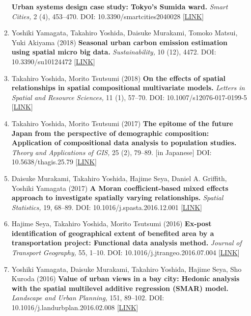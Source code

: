 \documentclass[
]{book}
\begin{document}
\begin{enumerate}
  \textbf{Urban systems design case study: Tokyo's Sumida ward.}
  \emph{Smart Cities,} 2 (4), 453--470.
  DOI: 10.3390/smartcities2040028 {[}\href{https://www.mdpi.com/2624-6511/2/4/28}{LINK}{]}
\item
  Yoshiki Yamagata, Takahiro Yoshida, Daisuke Murakami, Tomoko Matsui, Yuki Akiyama (2018)
  \textbf{Seasonal urban carbon emission estimation using spatial micro big data.}
  \emph{Sustainability,} 10 (12), 4472.
  DOI: 10.3390/su10124472 {[}\href{https://www.mdpi.com/2071-1050/10/12/4472}{LINK}{]}
\item
  Takahiro Yoshida, Morito Tsutsumi (2018)
  \textbf{On the effects of spatial relationships in spatial compositional multivariate models.}
  \emph{Letters in Spatial and Resource Sciences,} 11 (1), 57--70.
  DOI: 10.1007/s12076-017-0199-5 {[}\href{https://link.springer.com/article/10.1007/s12076-017-0199-5}{LINK}{]}
\item
  Takahiro Yoshida, Morito Tsutsumi (2017)
  \textbf{The epitome of the future Japan from the perspective of demographic composition: Application of compositional data analysis to population studies.}
  \emph{Theory and Applications of GIS,} 25 (2), 79--89. {[}in Japanese{]}
  DOI: 10.5638/thagis.25.79 {[}\href{https://www.jstage.jst.go.jp/article/thagis/25/2/25_79/_article/-char/en}{LINK}{]}
\item
  Daisuke Murakami, Takahiro Yoshida, Hajime Seya, Daniel A. Griffith, Yoshiki Yamagata (2017)
  \textbf{A Moran coefficient-based mixed effects approach to investigate spatially varying relationships.}
  \emph{Spatial Statistics,} 19, 68--89.
  DOI: 10.1016/j.spasta.2016.12.001 {[}\href{http://www.sciencedirect.com/science/article/pii/S2211675316301798}{LINK}{]}
\item
  Hajime Seya, Takahiro Yoshida, Morito Tsutsumi (2016)
  \textbf{Ex-post identification of geographical extent of benefited area by a transportation project: Functional data analysis method.}
  \emph{Journal of Transport Geography,} 55, 1--10.
  DOI: 10.1016/j.jtrangeo.2016.07.004 {[}\href{http://www.sciencedirect.com/science/article/pii/S0966692316303763}{LINK}{]}
\item
  Yoshiki Yamagata, Daisuke Murakami, Takahiro Yoshida, Hajime Seya, Sho Kuroda (2016)
  \textbf{Value of urban views in a bay city: Hedonic analysis with the spatial multilevel additive regression (SMAR) model.}
  \emph{Landscape and Urban Planning,} 151, 89--102.
  DOI: 10.1016/j.landurbplan.2016.02.008 {[}\href{http://www.sciencedirect.com/science/article/pii/S0169204616000232}{LINK}{]}
\end{enumerate}
\end{document}
